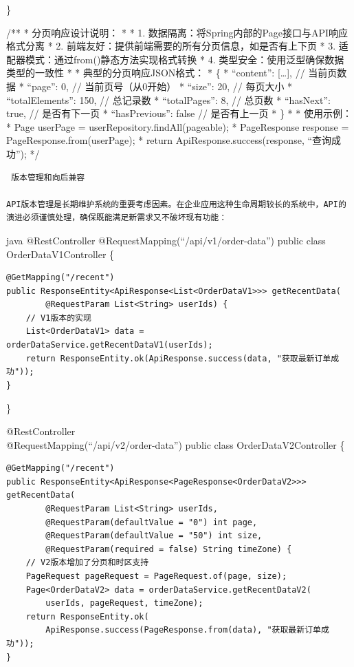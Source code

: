 \}

/** * 分页响应设计说明： * * 1. 数据隔离：将Spring内部的Page接口与API响应格式分离 * 2. 前端友好：提供前端需要的所有分页信息，如是否有上下页 * 3. 适配器模式：通过from()静态方法实现格式转换 * 4. 类型安全：使用泛型确保数据类型的一致性 * * 典型的分页响应JSON格式： * \{ * ``content'': {[}\ldots{]}, // 当前页数据 * ``page'': 0, // 当前页号（从0开始） * ``size'': 20, // 每页大小 * ``totalElements'': 150, // 总记录数 * ``totalPages'': 8, // 总页数 * ``hasNext'': true, // 是否有下一页 * ``hasPrevious'': false // 是否有上一页 * \} * * 使用示例： * Page userPage = userRepository.findAll(pageable); * PageResponse response = PageResponse.from(userPage); * return ApiResponse.success(response, ``查询成功''); */

\begin{lstlisting}
 版本管理和向后兼容

API版本管理是长期维护系统的重要考虑因素。在企业应用这种生命周期较长的系统中，API的演进必须谨慎处理，确保既能满足新需求又不破坏现有功能：
\end{lstlisting}

java @RestController @RequestMapping(``/api/v1/order-data'') public class OrderDataV1Controller \{

\begin{verbatim}
@GetMapping("/recent")
public ResponseEntity<ApiResponse<List<OrderDataV1>>> getRecentData(
        @RequestParam List<String> userIds) {
    // V1版本的实现
    List<OrderDataV1> data = orderDataService.getRecentDataV1(userIds);
    return ResponseEntity.ok(ApiResponse.success(data, "获取最新订单成功"));
}
\end{verbatim}

\}

@RestController\\
@RequestMapping(``/api/v2/order-data'') public class OrderDataV2Controller \{

\begin{verbatim}
@GetMapping("/recent")
public ResponseEntity<ApiResponse<PageResponse<OrderDataV2>>> getRecentData(
        @RequestParam List<String> userIds,
        @RequestParam(defaultValue = "0") int page,
        @RequestParam(defaultValue = "50") int size,
        @RequestParam(required = false) String timeZone) {
    // V2版本增加了分页和时区支持
    PageRequest pageRequest = PageRequest.of(page, size);
    Page<OrderDataV2> data = orderDataService.getRecentDataV2(
        userIds, pageRequest, timeZone);
    return ResponseEntity.ok(
        ApiResponse.success(PageResponse.from(data), "获取最新订单成功"));
}
\end{verbatim}

